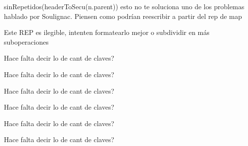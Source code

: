 \begin{DoxyRefList}
\item[\label{bug__bug000001}%
\hypertarget{bug__bug000001}{}%
Página \hyperlink{axiomas}{Axiomas y proposiciones auxiliares} ]sin\+Repetidos(header\+To\+Secu(n.\+parent)) esto no te soluciona uno de los problemas hablado por Soulignac. Piensen como podrían reescribir a partir del rep de map 
\item[\label{bug__bug000019}%
\hypertarget{bug__bug000019}{}%
Grupo \hyperlink{classaed2_1_1map_amgrpd5e8970aaf64693c88c5cfe5802755da}{Estructura de representación} ]Este R\+EP es ilegible, intenten formatearlo mejor o subdividir en más suboperaciones

Hace falta decir lo de cant de claves?

Hace falta decir lo de cant de claves?

Hace falta decir lo de cant de claves?

Hace falta decir lo de cant de claves?

Hace falta decir lo de cant de claves?

Hace falta decir lo de cant de claves?
\end{DoxyRefList}